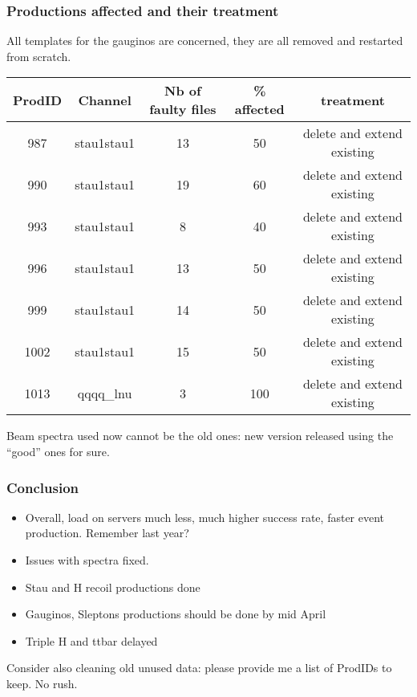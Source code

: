 \documentclass{beamer}
\begin{document}
\begin{frame}
\frametitle{Productions affected and their treatment}
All templates for the gauginos are concerned, they are all removed and restarted
from scratch.
\begin{center}
{\scriptsize 
\begin{tabular}{ccccc}
    \toprule
ProdID & Channel & Nb of faulty files & \% affected & treatment \\
\midrule
987 & stau1stau1 & 13  & 50 &  delete and extend existing\\
990 & stau1stau1 & 19  & 60 &  delete and extend existing\\
993 & stau1stau1 & 8 & 40 &  delete and extend existing\\
996 & stau1stau1 & 13 & 50 &  delete and extend existing\\
999 & stau1stau1 & 14  & 50 &  delete and extend existing\\
1002 & stau1stau1 & 15 & 50 &  delete and extend existing\\
1013 & qqqq\_lnu & 3  & 100 & delete and extend existing\\
     \bottomrule
\end{tabular}
}
\end{center}

Beam spectra used now cannot be the old ones: new version released using the
``good'' ones for sure.
\end{frame}

\begin{frame}
\frametitle{Conclusion}
\begin{itemize}
  \item Overall, load on servers much less, much higher success rate, faster
  event production. Remember last year?
  \item Issues with spectra fixed.
  \item Stau and H recoil productions done
  \item Gauginos, Sleptons productions should be done by mid
  April
  \item Triple H and ttbar delayed
\end{itemize}

Consider also cleaning old unused data: please provide me a list of ProdIDs to
keep. No rush.
\end{frame}
\end{document}
